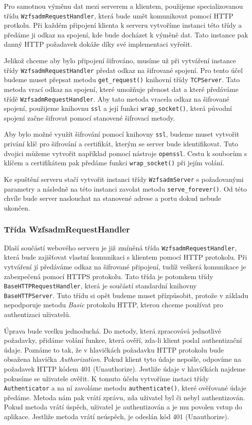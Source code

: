     Pro samotnou výměnu dat mezi serverem a klientem, použijeme specializovanou třídu \verb|WzfsadmRequestHandler|, která bude umět komunikovat pomocí HTTP protkolu. Při každém připojení klienta k serveru vytvoříme instanci této třídy a předáme ji odkaz na spojení, kde bude docházet k výměně dat. Tato instance pak danný HTTP požadavek dokáže díky své implementaci vyřešit.

    Jelikož chceme aby bylo připojení šifrováno, musíme už při vytváření instance třídy \verb|WzfsadmRequestHandler| předat odkaz na šifrované spojení. Pro tento účel budeme muset přepsat metodu \verb|get_request()| knihovní třídy \verb|TCPServer|. Tato metoda vrací odkaz na spojení, které umožňuje přenost dat a které předáváme třídě \verb|WzfsadmRequestHandler|. Aby tato metoda vracela odkaz na šifrované spojení, použijeme knihovnu \verb|ssl| a její funkci \verb|wrap_socket()|, která původní spojení začne šifrovat pomocí stanovené šifrovací metody.

    Aby bylo možné využít šifrování pomocí knihovny \verb|ssl|, budeme muset vytvořit privání klíč pro šifrování a certifikát, kterým se server bude identifikovat. Tuto dvojici můžeme vytvořit například pomocí nástroje \verb|openssl|. Cestu k souborům s klíčem a certifikátem pak předáme funkci \verb|wrap_socket()| při jejím volání.

    Ke spuštění serveru stačí vytvořit instanci třídy \verb|WzfsadmServer| s požadovanými parametry a následně na této instanci zavolat metodu \verb|serve_forever()|. Od této chvíle bude server naslouchat na stanovené adrese a portu dokud nebude ukončen.


    \subsubsection{Třída WzfsadmRequestHandler}
    Dlaší součástí webového serveru je již zmíněná třída \verb|WzfsadmRequestHandler|, která bude zajišťovat vlastní komunikaci s klientem pomocí HTTP protokolu. Při vytváření jí předáváme odkaz na šifrované připojení, tudíž veškerá komunikace je zabezpečená pomocí HTTPS protokolu. Tato třída je potomkem třídy \verb|BaseHTTPRequestHandler|, která je součástí standardní knihovny \verb|BaseHTTPServer|. Tuto třídu si opět budeme muset přízpůsobit, protože v základu nepodporuje metodu \emph{Basic} protokolu HTTP, kterou chceme používat pro authentizaci uživatelů.

    Úprava bude vcelku jednoduchá. Do metody, která zpracovává jednotlivé požadavky, přidáme volání funkce, která ověří, zda-li klient poslal authentizační údaje. Poznáme to tak, že v hlavičkách požadavku HTTP protokolu bude obsažena hlavička \emph{Authorization}. Pokud klient tyto údaje nepošle, odpovíme na požadavek HTTP kódem 401 (Unauthorize). Jestliže údaje v hlavičkách najdeme pokusíme se uživatele ověřit. K tomuto účelu vytvoříme instaci třídy \verb|Authenticator| a na ní zavoláme metodu \verb|authenticate()|, které ověřované údaje předáme. Metoda nám pak vrátí zprávu, zda uživatel  byl či nebyl authentizován. Pokud metoda vrátí úspěch, uživatel je authentizován a je mu povolen vstup do aplikace. Jestliže metoda vrátí neúspěch, je odeslán kód 401 (Unauthorize).

